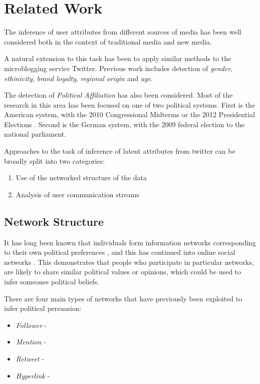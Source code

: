 \documentclass[bsc,frontabs,singlespacing,parskip]{infthesis}     %
\begin{document}
\chapter{Related Work}

The inference of user attributes from different sources of media has been well considered both in the context of traditional media and new media. 



A natural extension to this task has been to apply similar methods to the microblogging service Twitter. Previous work includes detection of \textit{gender}, \textit{ethinicity}, \textit{brand loyalty}, \textit{regional origin} and \textit{age}.\cite{yahoopaper}\cite{rao2010}

The detection of \textit{Political Affiliation} has also been considered. Most of the research in this area has been focused on one of two political systems. First is the American system, with the 2010 Congressional Midterms\cite{Conover2010predicting}  \cite{politicalpolar}\cite{yahoopaper} or the 2012 Presidential Elections \cite{quantpol}. Second is the German system, with the 2009 federal election to the national parliament\cite{predelections}\cite{dividedtheytweet}. 

Approaches to the task of inference of latent attributes from twitter can be broadly split into two categories:
\begin{enumerate}
\item{Use of the networked structure of the data}
\item{Analysis of user communication streams}
\end{enumerate}

\section{Network Structure}

It has long been known that individuals form information networks corresponding to their own political preferences \cite{socialflow}, and this has continued into online social networks \cite{birdsofafeather}. This demonstrates that people who participate in particular networks, are likely to share similar political values or opinions, which could be used to infer someones political beliefs.

There are four main types of networks that have previously been exploited to infer political persuasion:
\begin{itemize}
\item{\textit{Follower} - }
\item{\textit{Mention} - }
\item{\textit{Retweet} - }
\item{\textit{Hyperlink} - }
\end{itemize}
\end{document}
